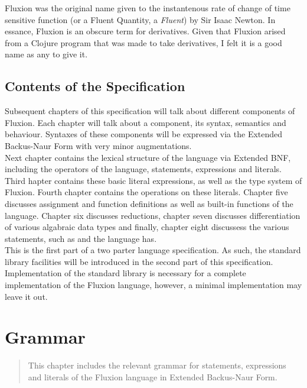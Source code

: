 \documentclass[11pt,a4paper]{book}
\begin{document}
Fluxion was the original name given to the instantenous rate of change of time sensitive function (or a Fluent Quantity, a \textit{Fluent}) by Sir Isaac Newton\cite{fluxionname}. In essance, Fluxion is an obscure term for derivatives\cite{collins}. Given that Fluxion arised from a Clojure program that was made to take derivatives, I felt it is a good name as any to give it.

\section{Contents of the Specification}

Subsequent chapters of this specification will talk about different components of Fluxion. Each chapter will talk about a component, its syntax, semantics and behaviour. Syntaxes of these components will be expressed via the Extended Backus-Naur Form\cite{ISO14977} with very minor augmentations. \\

Next chapter contains the lexical structure of the language via Extended BNF, including the operators of the language, statements, expressions and literals. Third hapter contains these basic literal expressions, as well as the type system of Fluxion. Fourth chapter contains the operations on these literals. Chapter five discusses assignment and function definitions as well as built-in functions of the language. Chapter six discusses reductions, chapter seven discusses differentiation of various algabraic data types and finally, chapter eight discussess the various statements, such as  and  the language has. \\

This is the first part of a two parter language specification. As such, the standard library facilities will be introduced in the second part of this specification. Implementation of the standard library is necessary for a complete implementation of the Fluxion language, however, a minimal implementation may leave it out.

\chapter{Grammar}
\vspace{1em}
\begin{quotation}
This chapter includes the relevant grammar for statements, expressions and literals of the Fluxion language in Extended Backus-Naur Form.
\end{quotation}
\newpage
\end{document}
